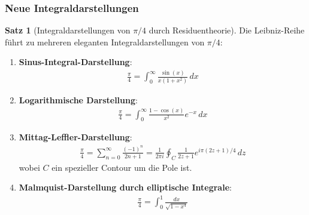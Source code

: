\documentclass[a4paper,12pt,twoside]{report}
\theoremstyle{definition}
\newtheorem{satz}{Satz}
\begin{document}
\subsubsection{Neue Integraldarstellungen}

\begin{satz}[Integraldarstellungen von $\pi/4$ durch Residuentheorie]
Die Leibniz-Reihe führt zu mehreren eleganten Integraldarstellungen von $\pi/4$:

\begin{enumerate}
	\item \textbf{Sinus-Integral-Darstellung}:
	\begin{align}
		\frac{\pi}{4} = \int_0^{\infty} \frac{\sin(x)}{x(1+x^2)} \, dx
		\label{eq:pi4_sin_integral}
	\end{align}
	
	\item \textbf{Logarithmische Darstellung}:
	\begin{align}
		\frac{\pi}{4} = \int_0^{\infty} \frac{1 - \cos(x)}{x^2} e^{-x} \, dx
		\label{eq:pi4_log_integral}
	\end{align}
	
	\item \textbf{Mittag-Leffler-Darstellung}:
	\begin{align}
		\frac{\pi}{4} = \sum_{n=0}^{\infty} \frac{(-1)^n}{2n+1} = \frac{1}{2\pi i} \oint_C \frac{1}{2z+1} e^{i\pi(2z+1)/4} \, dz
		\label{eq:pi4_mittag_leffler}
	\end{align}
	wobei $C$ ein spezieller Contour um die Pole ist.
	
	\item \textbf{Malmquist-Darstellung durch elliptische Integrale}:
	\begin{align}
		\frac{\pi}{4} = \int_0^1 \frac{dx}{\sqrt{1-x^4}}
		\label{eq:pi4_elliptic}
	\end{align}
\end{enumerate}
\end{satz}
\end{document}
